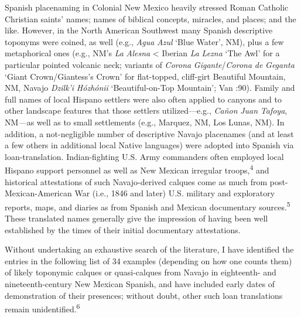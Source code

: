 Spanish placenaming in Colonial New Mexico heavily stressed Roman Catholic Christian saints’ names; names of biblical concepts, miracles, and places; and the like.  However, in the North American Southwest many Spanish descriptive toponyms were coined, as well (e.g., \textit{Agua} \textit{Azul} ‘Blue Water’, NM), plus a few metaphorical ones (e.g., NM’s \textit{La} \textit{Alesna} < Iberian \textit{La} \textit{Lezna} ‘The Awl’ for a particular pointed volcanic neck; variants of \textit{Corona} \textit{Gigante}/\textit{Corona} \textit{de} \textit{Geganta} ‘Giant Crown/Giantess’s Crown’ for flat-topped, cliff-girt Beautiful Mountain, NM, Navajo \textit{Dzilk'i} \textit{Hózhónii} ‘Beautiful-on-Top Mountain’; Van \citealt{ValkenburghWalker1945}:90).  Family and full names of local Hispano settlers were also often applied to canyons and to other landscape features that those settlers utilized—e.g., \textit{Cañon} \textit{Juan} \textit{Tafoya}, NM\textit{—}as well as to small settlements (e.g., Marquez, NM, Los Lunas, NM).  In addition, a not-negligible number of descriptive Navajo placenames (and at least a few others in additional local Native languages) were adopted into Spanish via loan-translation.  Indian-fighting U.S. Army commanders often employed local Hispano support personnel as well as New Mexican irregular troops,\textsuperscript{4} and historical attestations of such Navajo-derived calques come as much from post-Mexican-American War (i.e., 1846 and later) U.S. military and exploratory reports, maps, and diaries as from Spanish and Mexican documentary sources.\textsuperscript{5}  These translated names generally give the impression of having been well established by the times of their initial documentary attestations.

  Without undertaking an exhaustive search of the literature, I have identified the entries in the following list of 34 examples (depending on how one counts them) of likely toponymic calques or quasi-calques from Navajo in eighteenth- and nineteenth-century New Mexican Spanish, and have included early dates of demonstration of their presences; without doubt, other such loan translations remain unidentified.\textsuperscript{6}

